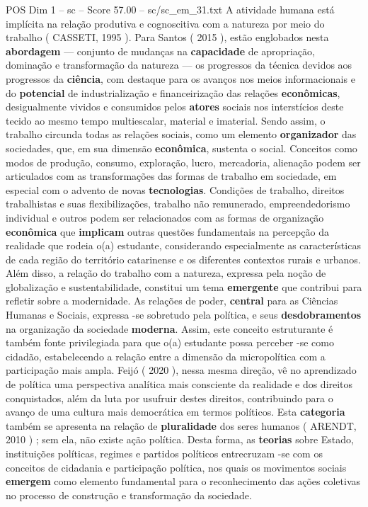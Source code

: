 \begin{textsample}{POS Dim 1 – sc – Score 57.00 – sc/sc\_em\_31.txt}
A atividade humana está implícita na relação produtiva e cognoscitiva com a natureza por meio do trabalho ( CASSETI, 1995 ).
Para Santos ( 2015 ), estão englobados nesta \textbf{abordagem} — conjunto de mudanças na \textbf{capacidade} de apropriação, dominação e transformação da natureza — os progressos da técnica devidos aos progressos da \textbf{ciência}, com destaque para os avanços nos meios informacionais e do \textbf{potencial} de industrialização e financeirização das relações \textbf{econômicas}, desigualmente vividos e consumidos pelos \textbf{atores} sociais nos interstícios deste tecido ao mesmo tempo multiescalar, material e imaterial.
Sendo assim, o trabalho circunda todas as relações sociais, como um elemento \textbf{organizador} das sociedades, que, em sua dimensão \textbf{econômica}, sustenta o social.
Conceitos como modos de produção, consumo, exploração, lucro, mercadoria, alienação podem ser articulados com as transformações das formas de trabalho em sociedade, em especial com o advento de novas \textbf{tecnologias}.
Condições de trabalho, direitos trabalhistas e suas flexibilizações, trabalho não remunerado, empreendedorismo individual e outros podem ser relacionados com as formas de organização \textbf{econômica} que \textbf{implicam} outras questões fundamentais na percepção da realidade que rodeia o(a) estudante, considerando especialmente as características de cada região do território catarinense e os diferentes contextos rurais e urbanos.
Além disso, a relação do trabalho com a natureza, expressa pela noção de globalização e sustentabilidade, constitui um tema \textbf{emergente} que contribui para refletir sobre a modernidade.
As relações de poder, \textbf{central} para as Ciências Humanas e Sociais, expressa -se sobretudo pela política, e seus \textbf{desdobramentos} na organização da sociedade \textbf{moderna}.
Assim, este conceito estruturante é também fonte privilegiada para que o(a) estudante possa perceber -se como cidadão, estabelecendo a relação entre a dimensão da micropolítica com a participação mais ampla.
Feijó ( 2020 ), nessa mesma direção, vê no aprendizado de política uma perspectiva analítica mais consciente da realidade e dos direitos conquistados, além da luta por usufruir destes direitos, contribuindo para o avanço de uma cultura mais democrática em termos políticos.
Esta \textbf{categoria} também se apresenta na relação de \textbf{pluralidade} dos seres humanos ( ARENDT, 2010 ) ; sem ela, não existe ação política.
Desta forma, as \textbf{teorias} sobre Estado, instituições políticas, regimes e partidos políticos entrecruzam -se com os conceitos de cidadania e participação política, nos quais os movimentos sociais \textbf{emergem} como elemento fundamental para o reconhecimento das ações coletivas no processo de construção e transformação da sociedade.

\end{textsample}
